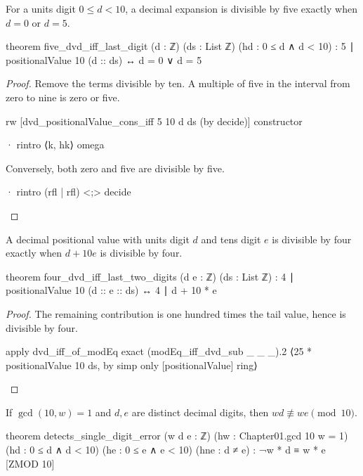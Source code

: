 \begin{theorem}
  \label{ent:thm:five-dvd-iff-last-digit}
  For a units digit $0\le d<10$, a decimal expansion is divisible by five exactly when $d=0$ or
  $d=5$.

  \begin{lean}
    theorem five_dvd_iff_last_digit (d : ℤ) (ds : List ℤ) (hd : 0 ≤ d ∧ d < 10) :
        5 ∣ positionalValue 10 (d :: ds) ↔ d = 0 ∨ d = 5
  \end{lean}
\end{theorem}

\begin{proof}
  Remove the terms divisible by ten.
  A multiple of five in the interval from zero to nine is zero or five.

  \begin{lean}
    rw [dvd_positionalValue_cons_iff 5 10 d ds (by decide)]
    constructor

    · rintro ⟨k, hk⟩
      omega
  \end{lean}

  Conversely, both zero and five are divisible by five.

  \begin{lean}
    · rintro (rfl | rfl) <;> decide
  \end{lean}
\end{proof}

\begin{theorem}
  \label{ent:thm:four-dvd-iff-last-two-digits}
  A decimal positional value with units digit $d$ and tens digit $e$ is divisible by four exactly
  when $d+10e$ is divisible by four.

  \begin{lean}
    theorem four_dvd_iff_last_two_digits (d e : ℤ) (ds : List ℤ) :
        4 ∣ positionalValue 10 (d :: e :: ds) ↔ 4 ∣ d + 10 * e
  \end{lean}
\end{theorem}

\begin{proof}
  The remaining contribution is one hundred times the tail value, hence is divisible by four.

  \begin{lean}
    apply dvd_iff_of_modEq
    exact (modEq_iff_dvd_sub _ _ _).2
      ⟨25 * positionalValue 10 ds, by
          simp only [positionalValue]
          ring⟩
  \end{lean}
\end{proof}

\begin{theorem}
  \label{ent:thm:detects-single-digit-error}
  If $\gcd(10,w)=1$ and $d,e$ are distinct decimal digits, then $wd\not\equiv we\pmod{10}$.

  \begin{lean}
    theorem detects_single_digit_error (w d e : ℤ) (hw : Chapter01.gcd 10 w = 1)
        (hd : 0 ≤ d ∧ d < 10) (he : 0 ≤ e ∧ e < 10) (hne : d ≠ e) :
        ¬w * d ≡ w * e [ZMOD 10]
  \end{lean}
\end{theorem}

